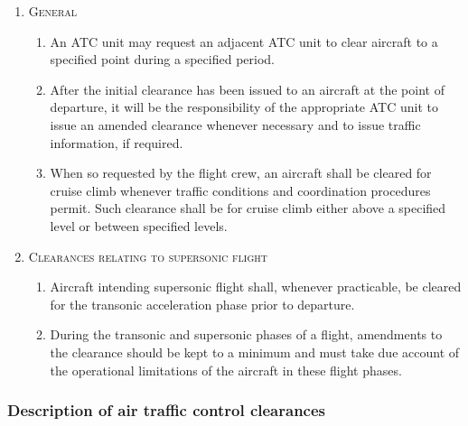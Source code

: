 \documentclass[../main.tex]{subfiles}
\begin{document}
    \begin{enumerate}[itemsep=0.2cm]\centering
        \item \textsc{General}
        \begin{enumerate}
            \item An ATC unit may request an adjacent ATC unit to clear aircraft to a specified point during a specified period.
            \item After the initial clearance has been issued to an aircraft at the point of departure, it will be the responsibility of the appropriate ATC unit to issue an amended clearance whenever necessary and to issue traffic information, if required.
            \item When so requested by the flight crew, an aircraft shall be cleared for cruise climb whenever traffic conditions and coordination procedures permit. Such clearance shall be for cruise climb either above a specified level or between specified levels.
        \end{enumerate}

        \item \textsc{Clearances relating to supersonic flight}
        \begin{enumerate}
            \item Aircraft intending supersonic flight shall, whenever practicable, be cleared for the transonic acceleration phase prior to departure.
            \item During the transonic and supersonic phases of a flight, amendments to the clearance should be kept to a minimum and must take due account of the operational limitations of the aircraft in these flight phases.
        \end{enumerate}
    \end{enumerate}

    \subsubsection{Description of air traffic control clearances}
\end{document}
